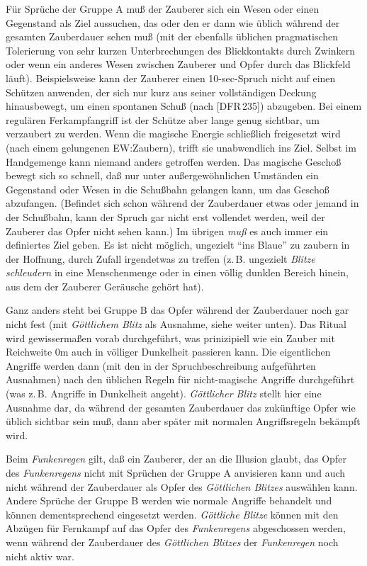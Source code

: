 \documentclass[10pt,a4paper,germanpar]{article}
\begin{document}
Für Sprüche der Gruppe A muß der Zauberer sich ein Wesen oder einen
Gegenstand als Ziel aussuchen, das oder den er dann wie üblich während
der gesamten Zauberdauer sehen muß (mit der ebenfalls üblichen
pragmatischen Tolerierung von sehr kurzen Unterbrechungen des
Blickkontakts durch Zwinkern oder wenn ein anderes Wesen zwischen
Zauberer und Opfer durch das Blickfeld läuft). Beispielsweise kann der
Zauberer einen 10-sec-Spruch nicht auf einen Schützen anwenden, der
sich nur kurz aus seiner vollständigen Deckung hinausbewegt, um einen
spontanen Schuß (nach [DFR\,235]) abzugeben. Bei einem regulären
Ferkampfangriff ist der Schütze aber lange genug sichtbar, um
verzaubert zu werden. Wenn die magische Energie schließlich
freigesetzt wird (nach einem gelungenen EW:Zaubern), trifft sie
unabwendlich ins Ziel. Selbst im Handgemenge kann niemand anders
getroffen werden. Das magische Geschoß bewegt sich so schnell, daß nur
unter außergewöhnlichen Umständen ein Gegenstand oder Wesen in die
Schußbahn gelangen kann, um das Geschoß abzufangen. (Befindet sich
schon während der Zauberdauer etwas oder jemand in der Schußbahn, kann
der Spruch gar nicht erst vollendet werden, weil der Zauberer das
Opfer nicht sehen kann.) Im übrigen \emph{muß} es auch immer ein
definiertes Ziel geben. Es ist nicht möglich, ungezielt "`ins Blaue"'
zu zaubern in der Hoffnung, durch Zufall irgendetwas zu treffen
(z.\,B. ungezielt \emph{Blitze schleudern} in eine Menschenmenge
oder in einen völlig dunklen Bereich hinein, aus dem der
Zauberer Geräusche gehört hat).

Ganz anders steht bei Gruppe B das Opfer während der Zauberdauer noch
gar nicht fest (mit \emph{Göttlichem Blitz} als Ausnahme, siehe weiter
unten). Das Ritual wird gewissermaßen vorab durchgeführt, was
prinizipiell wie ein Zauber mit Reichweite 0m auch in völliger
Dunkelheit passieren kann. Die eigentlichen Angriffe werden dann (mit
den in der Spruchbeschreibung aufgeführten Ausnahmen) nach den
üblichen Regeln für nicht-magische Angriffe durchgeführt (was
z.\,B. Angriffe in Dunkelheit angeht). \emph{Göttlicher Blitz} stellt
hier eine Ausnahme dar, da während der gesamten Zauberdauer das
zukünftige Opfer wie üblich sichtbar sein muß, dann aber später mit
normalen Angriffsregeln bekämpft wird.

Beim \emph{Funkenregen} gilt, daß ein Zauberer, der an die Illusion
glaubt, das Opfer des \emph{Funkenregens} nicht mit Sprüchen der
Gruppe A anvisieren kann und auch nicht während der Zauberdauer als
Opfer des \emph{Göttlichen Blitzes} auswählen kann. Andere Sprüche der
Gruppe B werden wie normale Angriffe behandelt und können
dementsprechend eingesetzt werden. \emph{Göttliche Blitze} können mit
den Abzügen für Fernkampf auf das Opfer des \emph{Funkenregens}
abgeschossen werden, wenn während der Zauberdauer des \emph{Göttlichen
  Blitzes} der \emph{Funkenregen} noch nicht aktiv war.
\end{document}

